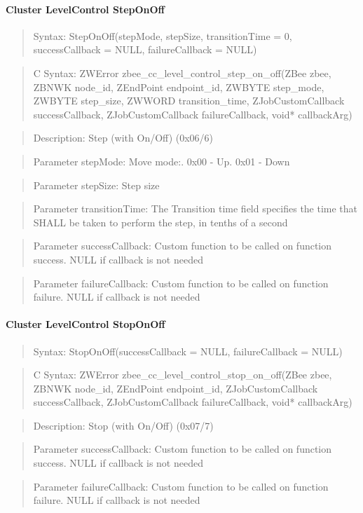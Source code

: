 \paragraph{Cluster LevelControl StepOnOff}
\begin{quote}Syntax: StepOnOff(stepMode, stepSize, transitionTime = 0, successCallback = NULL, failureCallback = NULL)\end{quote}
\begin{quote}C Syntax: ZWError zbee\_cc\_level\_control\_step\_on\_off(ZBee zbee, ZBNWK node\_id, ZEndPoint endpoint\_id, ZWBYTE step\_mode, ZWBYTE step\_size, ZWWORD transition\_time, ZJobCustomCallback successCallback, ZJobCustomCallback failureCallback, void* callbackArg)\end{quote}
\begin{quote}Description: Step (with On/Off) (0x06/6)\end{quote}
\begin{quote}Parameter stepMode: Move mode:. 0x00 - Up. 0x01 - Down\end{quote}
\begin{quote}Parameter stepSize: Step size\end{quote}
\begin{quote}Parameter transitionTime: The Transition time field specifies the time that SHALL be taken to perform the step, in tenths of a second\end{quote}
\begin{quote}Parameter successCallback: Custom function to be called on function success. NULL if callback is not needed\end{quote}
\begin{quote}Parameter failureCallback: Custom function to be called on function failure. NULL if callback is not needed\end{quote}


\paragraph{Cluster LevelControl StopOnOff}
\begin{quote}Syntax: StopOnOff(successCallback = NULL, failureCallback = NULL)\end{quote}
\begin{quote}C Syntax: ZWError zbee\_cc\_level\_control\_stop\_on\_off(ZBee zbee, ZBNWK node\_id, ZEndPoint endpoint\_id, ZJobCustomCallback successCallback, ZJobCustomCallback failureCallback, void* callbackArg)\end{quote}
\begin{quote}Description: Stop (with On/Off) (0x07/7)\end{quote}
\begin{quote}Parameter successCallback: Custom function to be called on function success. NULL if callback is not needed\end{quote}
\begin{quote}Parameter failureCallback: Custom function to be called on function failure. NULL if callback is not needed\end{quote}



